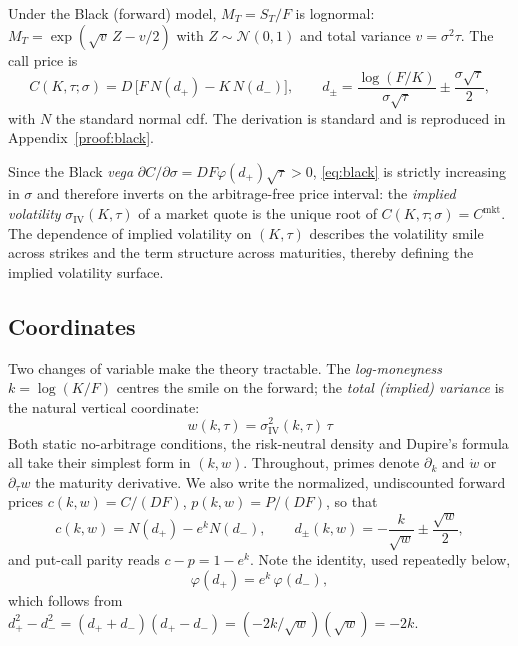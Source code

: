 Under the Black (forward) model, $M_T=S_T/F$ is lognormal: $M_T=\exp(\sqrt{v}\,Z-v/2)$ with
$Z\sim\mathcal N(0,1)$ and total variance $v=\sigma^2\tau$. The call price is
\begin{equation}\label{eq:black}
C(K,\tau;\sigma)=D\,\bigl[F\,N(d_+)-K\,N(d_-)\bigr],\qquad
d_\pm=\frac{\log(F/K)}{\sigma\sqrt{\tau}}\pm\frac{\sigma\sqrt{\tau}}{2},
\end{equation}
with $N$ the standard normal cdf. The derivation is standard and is reproduced in
Appendix~\ref{proof:black}.

Since the Black \emph{vega} $\partial C/\partial\sigma=DF\varphi(d_+)\sqrt\tau>0$,
\eqref{eq:black} is strictly increasing in $\sigma$ and therefore inverts on the
arbitrage-free price interval: the \emph{implied volatility} $\sigma_{\mathrm{IV}}(K,\tau)$ of a
market quote is the unique root of $C(K,\tau;\sigma)=C^{\mathrm{mkt}}$. The dependence of
implied volatility on $(K,\tau)$ describes the volatility smile across strikes and the term
structure across maturities, thereby defining the implied volatility surface.

\subsection{Coordinates}

Two changes of variable make the theory tractable. The \emph{log-moneyness} $k=\log(K/F)$
centres the smile on the forward; the \emph{total (implied) variance} is the natural vertical
coordinate:
\begin{equation}\label{eq:w}
w(k,\tau)=\sigma_{\mathrm{IV}}^2(k,\tau)\,\tau
\end{equation}
Both static no-arbitrage conditions, the risk-neutral
density and Dupire's formula all take their simplest form in $(k,w)$. Throughout, primes denote
$\partial_k$ and $\dot w$ or $\partial_\tau w$ the maturity derivative. We also write the
normalized, undiscounted forward prices $c(k,w)=C/(DF)$, $p(k,w)=P/(DF)$, so that
\begin{equation}\label{eq:blacknorm}
c(k,w)=N(d_+)-e^{k}N(d_-),\qquad d_\pm(k,w)=-\frac{k}{\sqrt w}\pm\frac{\sqrt w}{2},
\end{equation}
and put-call parity reads $c-p=1-e^{k}$. Note the identity, used repeatedly below,
\begin{equation}\label{eq:phiid}
\varphi(d_+)=e^{k}\,\varphi(d_-),
\end{equation}
which follows from $d_+^2-d_-^2=(d_++d_-)(d_+-d_-)=(-2k/\sqrt w)(\sqrt w)=-2k$.


